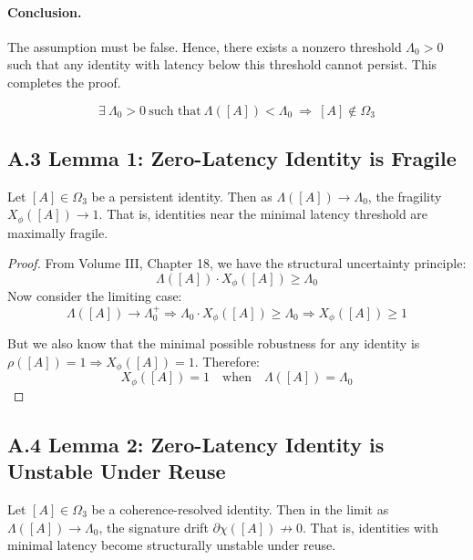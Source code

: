 \paragraph{Conclusion.}  
The assumption must be false. Hence, there exists a nonzero threshold $\Lambda_0 > 0$ such that any identity with latency below this threshold cannot persist. This completes the proof.

\begin{equation}
\boxed{
\exists\ \Lambda_0 > 0\ \text{such that}\ \Lambda([A]) < \Lambda_0\ \Rightarrow\ [A] \notin \Omega_3
}
\end{equation}

\subsection*{A.3 Lemma 1: Zero-Latency Identity is Fragile}

\begin{lemma}
Let $[A] \in \Omega_3$ be a persistent identity. Then as $\Lambda([A]) \to \Lambda_0$, the fragility $X_\phi([A]) \to 1$. That is, identities near the minimal latency threshold are maximally fragile.
\end{lemma}

\begin{proof}
From Volume III, Chapter 18, we have the structural uncertainty principle:
\[
\Lambda([A]) \cdot X_\phi([A]) \geq \Lambda_0
\]
Now consider the limiting case:
\[
\Lambda([A]) \to \Lambda_0^+
\Rightarrow \Lambda_0 \cdot X_\phi([A]) \geq \Lambda_0 \Rightarrow X_\phi([A]) \geq 1
\]

But we also know that the minimal possible robustness for any identity is $\rho([A]) = 1 \Rightarrow X_\phi([A]) = 1$. Therefore:
\[
X_\phi([A]) = 1 \quad \text{when} \quad \Lambda([A]) = \Lambda_0
\]
\end{proof}

\subsection*{A.4 Lemma 2: Zero-Latency Identity is Unstable Under Reuse}

\begin{lemma}
Let $[A] \in \Omega_3$ be a coherence-resolved identity. Then in the limit as $\Lambda([A]) \to \Lambda_0$, the signature drift $\partial \chi([A]) \not\to 0$. That is, identities with minimal latency become structurally unstable under reuse.
\end{lemma}

